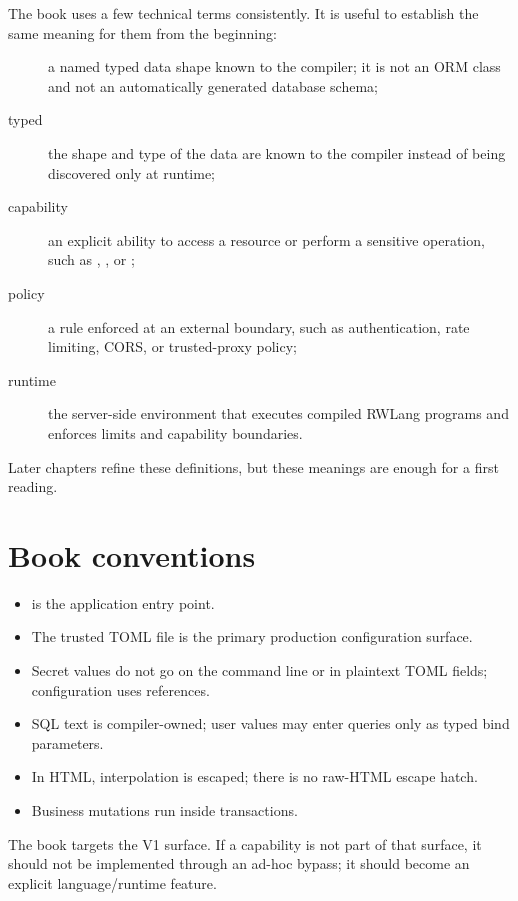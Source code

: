 The book uses a few technical terms consistently. It is useful to establish the same meaning for them from the beginning:

\begin{description}
  \item[] a named typed data shape known to the compiler; it is not an ORM class and not an automatically generated database schema;
  \item[typed] the shape and type of the data are known to the compiler instead of being discovered only at runtime;
  \item[capability] an explicit ability to access a resource or perform a sensitive operation, such as , , or ;
  \item[policy] a rule enforced at an external boundary, such as authentication, rate limiting, CORS, or trusted-proxy policy;
  \item[runtime] the server-side environment that executes compiled RWLang programs and enforces limits and capability boundaries.
\end{description}

Later chapters refine these definitions, but these meanings are enough for a first reading.

\section*{Book conventions}

\begin{itemize}
  \item {} is the application entry point.
  \item The trusted TOML file is the primary production configuration surface.
  \item Secret values do not go on the command line or in plaintext TOML fields; configuration uses  references.
  \item SQL text is compiler-owned; user values may enter queries only as typed bind parameters.
  \item In HTML,  interpolation is escaped; there is no raw-HTML escape hatch.
  \item Business mutations run inside transactions.
\end{itemize}

The book targets the V1 surface. If a capability is not part of that surface, it should not be implemented through an ad-hoc bypass; it should become an explicit language/runtime feature.
